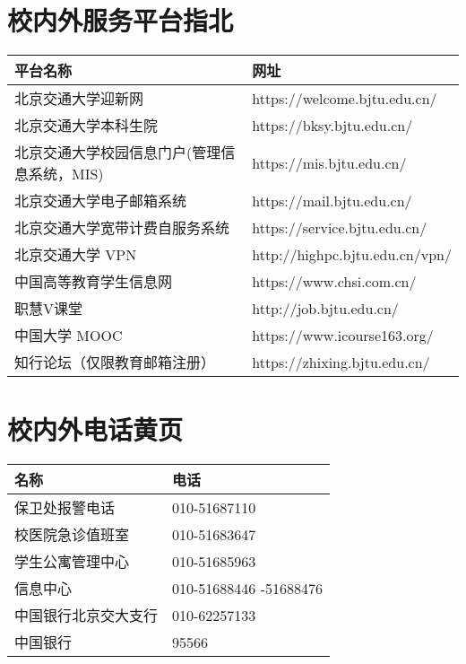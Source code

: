 \documentclass[a4paper]{ctexart}
\begin{document}
\section{校内外服务平台指北}

\begin{tabularx}{\textwidth}{XX}
	\toprule
	\textbf{平台名称} & \textbf{网址} \\
	\midrule
	北京交通大学迎新网 & https://welcome.bjtu.edu.cn/ \\
	北京交通大学本科生院 & https://bksy.bjtu.edu.cn/ \\
	北京交通大学校园信息门户\newline(管理信息系统，MIS) & https://mis.bjtu.edu.cn/ \\
	北京交通大学电子邮箱系统 & https://mail.bjtu.edu.cn/ \\
	北京交通大学宽带计费自服务系统 & https://service.bjtu.edu.cn/ \\
	北京交通大学 VPN & http://highpc.bjtu.edu.cn/vpn/ \\
	中国高等教育学生信息网 & https://www.chsi.com.cn/ \\
	职慧V课堂 & http://job.bjtu.edu.cn/ \\
	中国大学 MOOC & https://www.icourse163.org/ \\
	知行论坛（仅限教育邮箱注册） & https://zhixing.bjtu.edu.cn/ \\

	\bottomrule
\end{tabularx}

\section{校内外电话黄页}

\begin{tabularx}{\textwidth}{XX}
	\toprule
	\textbf{名称} & \textbf{电话} \\
	\midrule
	保卫处报警电话 & 010-51687110 \\
	校医院急诊值班室 & 010-51683647 \\
	学生公寓管理中心 & 010-51685963 \\
	信息中心 & 010-51688446 \newline 010-51688476 \\
	中国银行北京交大支行 & 010-62257133 \\
	中国银行 & 95566 \\
	\bottomrule
\end{tabularx}
\end{document}
